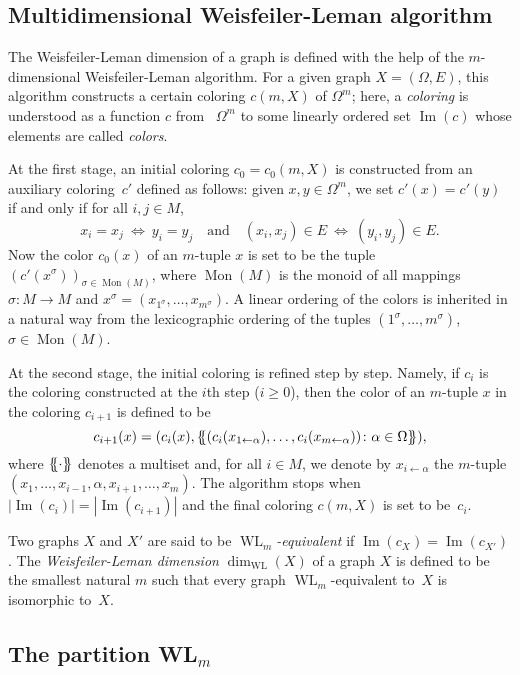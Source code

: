 \documentclass{amsart}
\def\qtnl#1{\begin{equation}\label{#1}}
\def\eqtn{\end{equation}}
\DeclareMathOperator{\im}{Im}
\DeclareMathOperator{\mon}{Mon}
\DeclareMathOperator{\WL}{WL}
\def\mltst#1{\{\hspace{-3pt}\{#1\}\hspace{-3pt}\}}
\def\qaq{\quad\text{and}\quad}
\begin{document}
\subsection{Multidimensional Weisfeiler-Leman algorithm}
The Weisfeiler-Leman dimension of a graph is defined with the help of 	the $m$-dimensional Weisfeiler-Leman algorithm. For a  given graph $X=(\Omega,E)$, this algorithm  constructs a certain coloring $c(m,X)$ of  $\Omega^m$; here, a \emph{coloring} is understood 
as a function $c$ from ~$\Omega^m$ to some linearly ordered 
set $\im(c)$ whose elements are called \emph{colors}.

At the first stage, an initial coloring $c_0=c_0(m,X)$ is constructed  from an auxiliary coloring~$c'$ defined as follows: given $x,y\in\Omega^m$,  we set $c'(x)=c'(y)$ if and only if for all $i,j\in M$,
\qtnl{250623k}
x_i=x_j\ \Leftrightarrow\ y_i=y_j\qaq  (x_i,x_j)\in E\ \Leftrightarrow\ (y_i,y_j)\in E.
\eqtn
Now the color $c_0(x)$ of  an $m$-tuple $x$ is set to be the tuple $(c'(x^\sigma))_{\sigma\in\mon(M)}$, where $\mon(M)$ is the monoid 
of all mappings $\sigma\colon M\to M$ and  $x^\sigma=(x_{1^\sigma},\ldots,x_{m^\sigma})$.  A linear ordering of 
the colors is inherited in a natural way from 
the lexicographic ordering of the tuples $(1^\sigma,\ldots,m^\sigma)$, $\sigma\in\mon(M)$.

At the second stage, the initial coloring is refined step by step. Namely, if $c_i$ is the coloring constructed at the $i$th step ($i\ge 0$), then the color of an $m$-tuple $x$ in the coloring $c_{i+1}$ is defined to be 
$$
c_{i+1}(x)=(c_i(x),\mltst{(c_i(x_{1\leftarrow \alpha}),\ldots,c_i(x_{m\leftarrow \alpha}))\colon \alpha\in\Omega}),
$$
where $\mltst{\cdot}$ denotes a multiset and, for all $i\in M$, we denote by 
$x_{i\leftarrow \alpha}$ the $m$-tuple $(x_1,\ldots,x_{i-1},\alpha,x_{i+1},\ldots,x_m)$. The algorithm stops when $|\im(c_i)|=|\im(c_{i+1})|$ and the final coloring $c(m,X)$ is set to be~$c_i$.

Two graphs $X$ and $X'$ are said to be {\it $\WL_m$-equivalent} if $\im(c_{X^{}})=\im(c_{X'})$. The \emph{Weisfeiler-Leman dimension} $\dim_{\scriptscriptstyle\WL}(X)$ of a graph $X$ is defined to be the smallest natural $m$ such that every graph $\WL_m$-equivalent to~$X$ is isomorphic to~$X$. 

\subsection{The partition WL$_m$}
\end{document}
